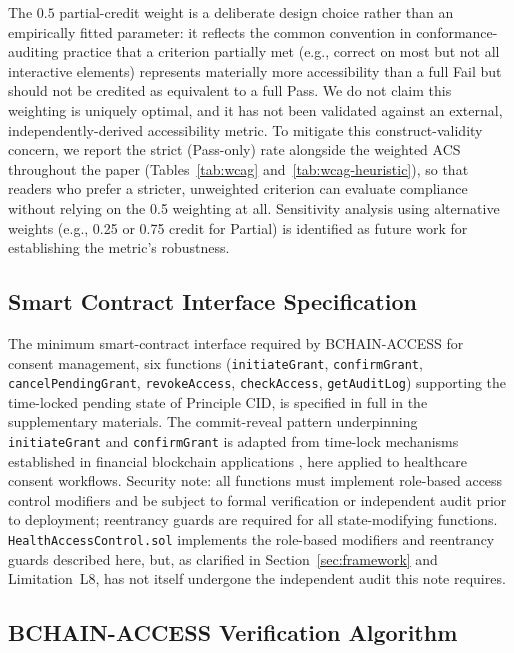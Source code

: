 \documentclass[journal,onecolumn]{IEEEtran}
\begin{document}
The $0.5$ partial-credit weight is a deliberate design choice rather than an empirically fitted parameter: it reflects the common convention in conformance-auditing practice that a criterion partially met (e.g., correct on most but not all interactive elements) represents materially more accessibility than a full Fail but should not be credited as equivalent to a full Pass. We do not claim this weighting is uniquely optimal, and it has not been validated against an external, independently-derived accessibility metric. To mitigate this construct-validity concern, we report the strict (Pass-only) rate alongside the weighted ACS throughout the paper (Tables~\ref{tab:wcag} and~\ref{tab:wcag-heuristic}), so that readers who prefer a stricter, unweighted criterion can evaluate compliance without relying on the 0.5 weighting at all. Sensitivity analysis using alternative weights (e.g., 0.25 or 0.75 credit for Partial) is identified as future work for establishing the metric's robustness.


\subsection{Smart Contract Interface Specification}

The minimum smart-contract interface required by BCHAIN-ACCESS for consent management, six functions (\texttt{initiateGrant}, \texttt{confirmGrant}, \texttt{cancelPendingGrant}, \texttt{revokeAccess}, \texttt{checkAccess}, \texttt{getAuditLog}) supporting the time-locked pending state of Principle CID, is specified in full in the supplementary materials. The commit-reveal pattern underpinning \texttt{initiateGrant} and \texttt{confirmGrant} is adapted from time-lock mechanisms established in financial blockchain applications \cite{buterin2014ethereum}, here applied to healthcare consent workflows. Security note: all functions must implement role-based access control modifiers and be subject to formal verification or independent audit prior to deployment; reentrancy guards are required for all state-modifying functions. \texttt{HealthAccessControl.sol} implements the role-based modifiers and reentrancy guards described here, but, as clarified in Section~\ref{sec:framework} and Limitation~L8, has not itself undergone the independent audit this note requires.




\subsection{BCHAIN-ACCESS Verification Algorithm}
\end{document}
